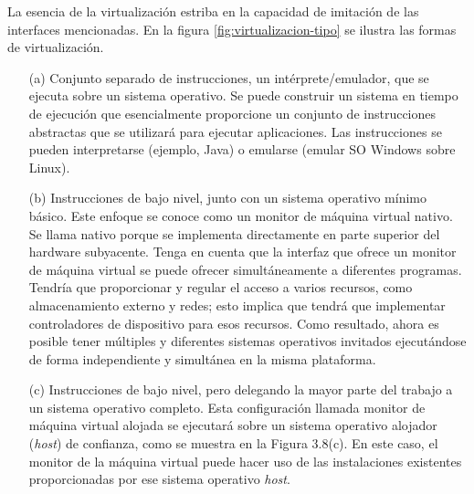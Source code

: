  
	
	La esencia de la virtualización estriba en la capacidad de imitación de las interfaces mencionadas. En la figura \ref{fig:virtualizacion-tipo}   se ilustra las formas de virtualización.   
	
 
	\begin{enumerate}
		
		\item [(a)] Conjunto separado de instrucciones, un intérprete/emulador, que se ejecuta sobre un sistema operativo.
		Se puede construir un sistema en tiempo de ejecución que esencialmente proporcione un conjunto de instrucciones abstractas que se utilizará para ejecutar aplicaciones. Las instrucciones se pueden interpretarse (ejemplo, Java) o emularse  (emular SO Windows sobre Linux).
		
		\item [(b)] Instrucciones de bajo nivel, junto con un sistema operativo mínimo básico. 
		Este enfoque  se conoce como un monitor de máquina virtual nativo. Se llama nativo porque se implementa directamente en parte superior del hardware subyacente. Tenga en cuenta que la interfaz que ofrece un monitor de máquina virtual se puede ofrecer simultáneamente a diferentes programas. Tendría que proporcionar y regular el acceso
		a varios recursos, como almacenamiento externo y redes; esto implica que tendrá que implementar controladores de dispositivo para esos recursos. 		
		 Como resultado, ahora es posible tener múltiples y diferentes sistemas operativos invitados ejecutándose de forma independiente y simultánea en la misma plataforma.
		 
		
		
		\item [(c)] Instrucciones de bajo nivel, pero delegando la mayor parte del trabajo a un sistema operativo completo.	
		 Esta configuración llamada  monitor de máquina virtual alojada se ejecutará sobre un sistema operativo alojador (\textit{host}) de confianza, como se muestra en la Figura 3.8(c). En este caso, el monitor de la máquina virtual puede hacer uso de las instalaciones existentes proporcionadas por ese sistema operativo \textit{host}.
		
		
		
	\end{enumerate}
	
 
